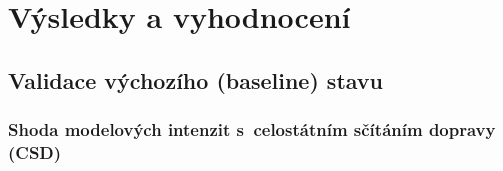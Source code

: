 \chapter{Výsledky a vyhodnocení}
\label{ch:vysledky}

%


\section{Validace výchozího (baseline) stavu}
\label{sec:baseline}


\subsection{Shoda modelových intenzit s~celostátním sčítáním dopravy (CSD)}

